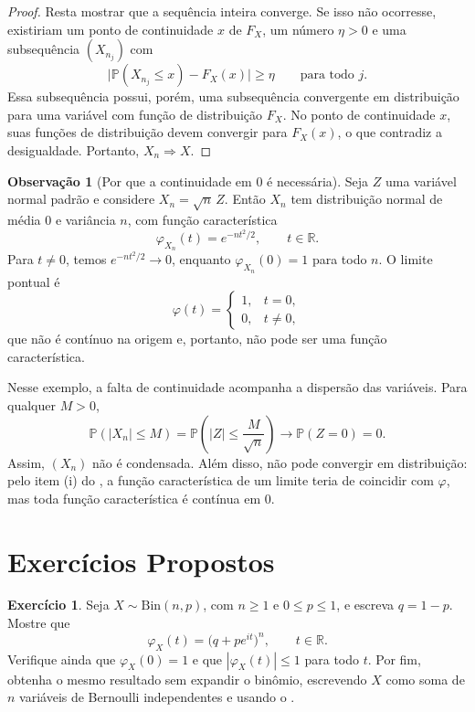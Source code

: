 \documentclass[12pt,portuguese]{article}
\theoremstyle{definition}
\newtheorem{remark}[remark]{Observação}
\theoremstyle{plainexercise}
\newtheorem{exercise}{Exercício}
\theoremstyle{starredexercise}
\theoremstyle{definition}
\begin{document}
\begin{proof}
Resta mostrar que a sequência inteira converge. Se isso não ocorresse,
existiriam um ponto de continuidade $x$ de $F_X$, um número $\eta>0$ e uma
subsequência $(X_{n_j})$ com
\[
\bigl|\mathbb{P}(X_{n_j}\leqslant x)-F_X(x)\bigr|\geqslant\eta
\qquad\text{para todo }j.
\]
Essa subsequência possui, porém, uma subsequência convergente em distribuição
para uma variável com função de distribuição $F_X$. No ponto de continuidade
$x$, suas funções de distribuição devem convergir para $F_X(x)$, o que
contradiz a desigualdade. Portanto, $X_n\Rightarrow X$.
\end{proof}

\begin{remark}[Por que a continuidade em $0$ é necessária]\label{rem:continuidade-origem}
Seja $Z$ uma variável normal padrão e considere $X_n=\sqrt{n}\,Z$. Então
$X_n$ tem distribuição normal de média $0$ e variância $n$, com função
característica
\[
\varphi_{X_n}(t)=e^{-nt^2/2},\qquad t\in\mathbb{R}.
\]
Para $t\neq0$, temos $e^{-nt^2/2}\to0$, enquanto $\varphi_{X_n}(0)=1$ para todo
$n$. O limite pontual é
\[
\varphi(t)=
\begin{cases}
1, & t=0,\\[0.2cm]
0, & t\neq0,
\end{cases}
\]
que não é contínuo na origem e, portanto, não pode ser uma função
característica.

Nesse exemplo, a falta de continuidade acompanha a dispersão das variáveis.
Para qualquer $M>0$,
\[
\mathbb{P}(|X_n|\leqslant M)
=\mathbb{P}\left(|Z|\leqslant\frac{M}{\sqrt n}\right)
\longrightarrow\mathbb{P}(Z=0)=0.
\]
Assim, $(X_n)$ não é condensada. Além disso, não pode convergir em
distribuição: pelo item (i) do , a função característica
de um limite teria de coincidir com $\varphi$, mas toda função característica
é contínua em $0$.
\end{remark}

\section{Exercícios Propostos}\label{sec:exercicios}

\begin{exercise}\label{exercise:gw-7-95}
Seja $X\sim\mathrm{Bin}(n,p)$, com $n\geqslant1$ e $0\leqslant p\leqslant1$, e
escreva $q=1-p$. Mostre que
\[
\varphi_X(t)=\bigl(q+pe^{it}\bigr)^{n}, \qquad t\in\mathbb{R}.
\]
Verifique ainda que $\varphi_X(0)=1$ e que $|\varphi_X(t)|\leqslant1$ para todo
$t$. Por fim, obtenha o mesmo resultado sem expandir o binômio, escrevendo $X$
como soma de $n$ variáveis de Bernoulli independentes e usando o
.
\end{exercise}
\end{document}
